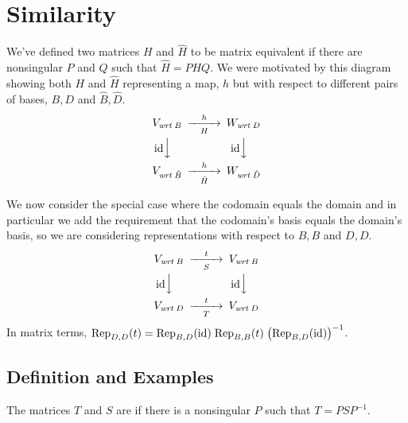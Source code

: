 \section{Similarity}
We've defined two matrices \( H \) and \( \hat{H} \) to be
matrix equivalent if there are nonsingular \( P \) and \( Q \)
such that \( \hat{H}=PHQ \).
We were motivated by this diagram
showing both $H$ and $\hat{H}$ representing a map, 
$h$ but with respect to different
pairs of bases, $B,D$ and $\hat{B},\hat{D}$.
\begin{equation*}
  \begin{CD}
    V_\wrt{B}                   @>h>H>        W_\wrt{D}       \\
    @V{\scriptstyle\identity} VV              @V{\scriptstyle\identity} VV \\
    V_\wrt{\hat{B}}             @>h>\hat{H}>  W_\wrt{\hat{D}}
  \end{CD}
\end{equation*}

We now consider the special case
where the codomain equals the domain and in particular we add the requirement
that the codomain's basis equals the domain's basis,
so we are considering representations with respect to 
$B,B$ and $D,D$.
\begin{equation*}
  \begin{CD}
    V_\wrt{B}                   @>t>S>        V_\wrt{B}       \\
    @V{\scriptstyle\identity} VV              @V{\scriptstyle\identity} VV \\
    V_\wrt{D}                   @>t>T>        V_\wrt{D}
  \end{CD}
\end{equation*}
In matrix terms, 
\(\rep{t}{D,D}
  =\rep{\identity}{B,D}\;\rep{t}{B,B}\;\bigl(\rep{\identity}{B,D}\bigr)^{-1} \).



\subsection{Definition and Examples}
\begin{definition}
The matrices  \( T \) and $S$ are 
%
if there is a nonsingular \( P \) such that
$
  T=PSP^{-1}
$.
\end{definition}

